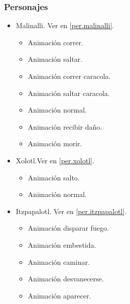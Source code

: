 \documentclass[11pt,letterpaper]{article}
\begin{document}
\begin{itemize}
        \subsubsection{Personajes}
        \begin{itemize}
                \item Malinalli. Ver en \ref{per.malinalli}.
                \begin{itemize}
                        \item Animación correr.
                        \item Animación saltar.
                        \item Animación correr caracola.
                        \item Animación saltar caracola.
                        \item Animación normal.
                        \item Animación recibir daño.
						\item Animación morir.
                \end{itemize}
                \item Xolotl.Ver en \ref{per.xolotl}.
                	\begin{itemize}
						\item Animación salto.
						\item Animación normal.
					\end{itemize}
                \item Itzpapalotl. Ver en \ref{per.itzpapalotl}.
                \begin{itemize}
                        \item Animación disparar fuego.
                        \item Animación embestida.
                        \item Animación caminar.
                        \item Animación desvanecerse.
                        \item Animación aparecer.
                \end{itemize}
        \end{itemize}

\end{itemize}
\end{document}
